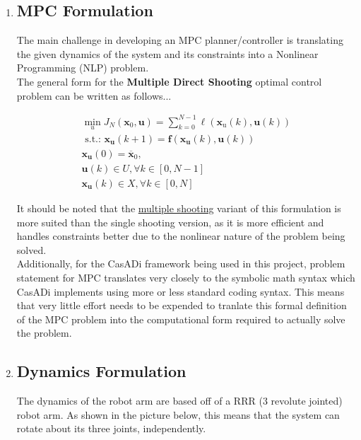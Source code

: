 \documentclass[12px]{article}
\begin{document}
        \begin{enumerate}
            \item \subsection*{MPC Formulation}
            \noindent The main challenge in developing an MPC planner/controller is translating the given dynamics of the system and its constraints into a Nonlinear Programming (NLP) problem.\\

            The general form for the \textbf{Multiple Direct Shooting} optimal control problem can be written as follows...

            $$
            \begin{array}{l}
            \min _{u} J_{N}\left(\mathbf{x}_{0}, \mathbf{u}\right)=\sum_{k=0}^{N-1} \ell\left(\mathbf{x}_{\mathrm{u}}(k), \mathbf{u}(k)\right) \\
            \text { s.t.: } \mathbf{x}_{\mathbf{u}}(k+1)=\mathbf{f}\left(\mathbf{x}_{\mathbf{u}}(k), \mathbf{u}(k)\right) \\
            \mathbf{x}_{\mathbf{u}}(0)=\overline{\mathbf{x}}_{0}, \\
            \mathbf{u}(k) \in U, \forall k \in[0, N-1] \\
            \mathbf{x}_{\mathbf{u}}(k) \in X, \forall k \in[0, N]
            \end{array}
            $$


            \noindent It should be noted that the \underline{multiple shooting} variant of this formulation is more suited than the single shooting version, as it is more efficient and handles constraints better due to the nonlinear nature of the problem being solved. \\

            \noindent Additionally, for the CasADi framework being used in this project, problem statement for MPC translates very closely to the symbolic math syntax which CasADi implements using more or less standard coding syntax. This means that very little effort needs to be expended to tranlate this formal definition of the MPC problem into the computational form required to actually solve the problem.


            \item     \subsection*{Dynamics Formulation}
            The dynamics of the robot arm are based off of a RRR (3 revolute jointed) robot arm. As shown in the picture below, this means that the system can rotate about its three joints, independently.


\end{enumerate}
\end{document}
